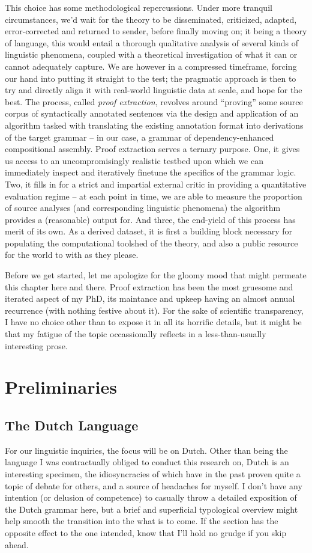 This choice has some methodological repercussions.
Under more tranquil circumstances, we'd wait for the theory to be disseminated, criticized, adapted, error-corrected and returned to sender, before finally moving on; it being a theory of language, this would entail a thorough qualitative analysis of several kinds of linguistic phenomena, coupled with a theoretical investigation of what it can or cannot adequately capture.
We are however in a compressed timeframe, forcing our hand into putting it straight to the test; the pragmatic approach is then to try and directly align it with real-world linguistic data at scale, and hope for the best.
The process, called \textit{proof extraction}, revolves around ``proving''  some source corpus of syntactically annotated sentences via the design and application of an algorithm tasked with translating the existing annotation format into derivations of the target grammar -- in our case, a grammar of dependency-enhanced compositional assembly.
Proof extraction serves a ternary purpose.
One, it gives us access to an uncompromisingly realistic testbed upon which we can immediately inspect and iteratively finetune the specifics of the grammar logic.
Two, it fills in for a strict and impartial external critic in providing a quantitative evaluation regime -- at each point in time, we are able to measure the proportion of source analyses (and corresponding linguistic phenomena) the algorithm provides a (reasonable) output for.
And three, the end-yield of this process has merit of its own.
As a derived dataset, it is first a building block necessary for populating the computational toolshed of the theory, and also a public resource for the world to with as they please.

Before we get started, let me apologize for the gloomy mood that might permeate this chapter here and there.
Proof extraction has been the most gruesome and iterated aspect of my PhD, its maintance and upkeep having an almost annual recurrence (with nothing festive about it).
For the sake of scientific transparency, I have no choice other than to expose it in all its horrific details, but it might be that my fatigue of the topic occassionally reflects in a less-than-usually interesting prose.

\section{Preliminaries}
\subsection{The Dutch Language}
For our linguistic inquiries, the focus will be on Dutch.
Other than being the language I was contractually obliged to conduct this research on, Dutch is an interesting specimen, the idiosyncracies of which have in the past proven quite a topic of debate for others, and a source of headaches for myself.
I don't have any intention (or delusion of competence) to casually throw a detailed exposition of the Dutch grammar here, but a brief and superficial typological overview might help smooth the transition into the what is to come.
If the section has the opposite effect to the one intended, know that I'll hold no grudge if you skip ahead.

